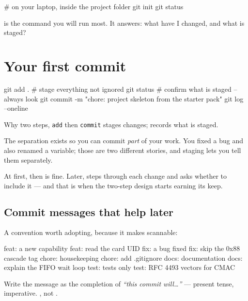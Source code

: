 \begin{shell}
# on your laptop, inside the project folder
git init
git status
\end{shell}

 is the command you will run most. It answers: what have I
changed, and what is staged?

\section{Your first commit}

\begin{shell}
git add .                 # stage everything not ignored
git status                # confirm what is staged -- always look
git commit -m "chore: project skeleton from the starter pack"
git log --oneline
\end{shell}

\begin{concept}{Why two steps, \texttt{add} then \texttt{commit}}
 stages changes;  records what is staged.

The separation exists so you can commit \emph{part} of your work. You fixed a
bug and also renamed a variable; those are two different stories, and staging
lets you tell them separately.

At first,  then  is fine. Later,  steps through each change and asks whether to include it --- and that is when
the two-step design starts earning its keep.
\end{concept}

\subsection*{Commit messages that help later}

A convention worth adopting, because it makes  scannable:

\begin{trace}
feat:  a new capability          feat: read the card UID
fix:   a bug fixed               fix: skip the 0x88 cascade tag
chore: housekeeping              chore: add .gitignore
docs:  documentation             docs: explain the FIFO wait loop
test:  tests only                test: RFC 4493 vectors for CMAC
\end{trace}

Write the message as the completion of \emph{``this commit will\ldots''} ---
present tense, imperative. , not .


